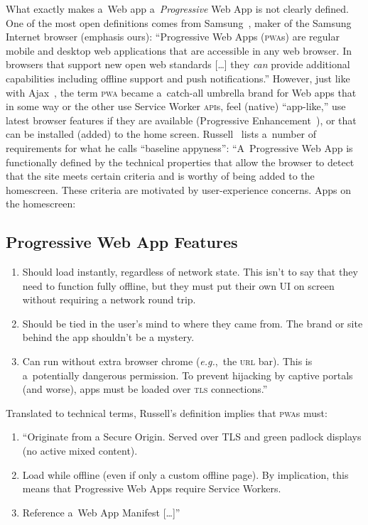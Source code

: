 \documentclass[sigconf]{acmart}
\begin{document}
What exactly makes a~Web app a~\emph{Progressive} Web App is not clearly defined.
One of the most open definitions comes from Samsung~\cite{samsung2017pwa},
maker of the Samsung Internet browser (emphasis ours):
``Progressive Web Apps (\textsc{pwa}s) are regular mobile and desktop web applications
that are accessible in any web browser.
In browsers that support new open web standards [\ldots]
they \emph{can} provide additional capabilities
including offline support and push notifications.''
However, just like with Ajax~\cite{garret2005ajax}, the term \textsc{pwa}
became a~catch-all umbrella brand for Web apps
that in some way or the other use Service Worker \textsc{api}s,
feel (native) ``app-like,'' use latest browser features if they are available
(Progressive Enhancement~\cite{champeon2003progressiveenhancement}),
or that can be installed (added) to the home screen.
Russell~\cite{russell2016pwa} lists a~number of requirements 
for what he calls ``baseline appyness'':
``A~Progressive Web App is functionally defined by the technical properties
that allow the browser to detect that the site meets certain criteria
and is worthy of being added to the homescreen.
These criteria are motivated by user-experience concerns.
Apps on the homescreen:

\subsection{Progressive Web App Features}

\begin{enumerate}
  \item Should load instantly, regardless of network state.
    This isn't to say that they need to function fully offline,
    but they must put their own UI on screen without requiring a network round trip.
  \item Should be tied in the user's mind to where they came from.
    The brand or site behind the app shouldn't be a mystery.
  \item Can run without extra browser chrome (\emph{e.g.},\ the \textsc{url} bar).
    This is a~potentially dangerous permission.
    To prevent hijacking by captive portals (and worse),
    apps must be loaded over \textsc{tls} connections.''
\end{enumerate}

Translated to technical terms, Russell's definition implies that \textsc{pwa}s must:

\begin{enumerate}
  \item ``Originate from a Secure Origin.
    Served over TLS and green padlock displays (no active mixed content).
  \item Load while offline (even if only a custom offline page).
    By implication, this means that Progressive Web Apps require Service Workers.
  \item Reference a~Web App Manifest [\ldots]''
\end{enumerate}
\end{document}
